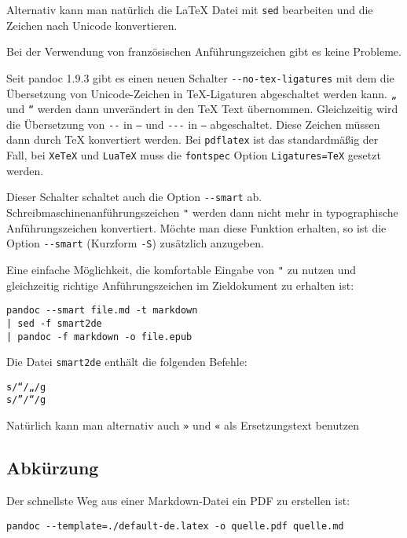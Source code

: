 \documentclass[11pt,ngerman,a4paper]{article}
\begin{document}
Alternativ kann man natürlich die LaTeX Datei mit \texttt{sed}
bearbeiten und die Zeichen nach Unicode konvertieren.

Bei der Verwendung von französischen Anführungszeichen gibt es keine
Probleme.

Seit pandoc 1.9.3 gibt es einen neuen Schalter
\texttt{-{}-no-tex-ligatures} mit dem die Übersetzung von
Unicode-Zeichen in TeX-Ligaturen abgeschaltet werden kann. \texttt{„}
und \texttt{“} werden dann unverändert in den TeX Text übernommen.
Gleichzeitig wird die Übersetzung von \texttt{-{}-} in \texttt{–} und
\texttt{-{}-{}-} in \texttt{—} abgeschaltet. Diese Zeichen müssen dann
durch TeX konvertiert werden. Bei \texttt{pdflatex} ist das
standardmäßig der Fall, bei \texttt{XeTeX} und \texttt{LuaTeX} muss die
\texttt{fontspec} Option \texttt{Ligatures=TeX} gesetzt werden.

Dieser Schalter schaltet auch die Option \texttt{-{}-smart} ab.
Schreibmaschinenanführungszeichen \texttt{"} werden dann nicht mehr in
typographische Anführungszeichen konvertiert. Möchte man diese Funktion
erhalten, so ist die Option \texttt{-{}-smart} (Kurzform \texttt{-S})
zusätzlich anzugeben.

Eine einfache Möglichkeit, die komfortable Eingabe von \texttt{"} zu
nutzen und gleichzeitig richtige Anführungszeichen im Zieldokument zu
erhalten ist:

\begin{verbatim}
pandoc --smart file.md -t markdown 
| sed -f smart2de 
| pandoc -f markdown -o file.epub
\end{verbatim}

Die Datei \texttt{smart2de} enthält die folgenden Befehle:

\begin{verbatim}
s/“/„/g
s/”/“/g
\end{verbatim}

Natürlich kann man alternativ auch \texttt{»} und \texttt{«} als
Ersetzungstext benutzen

\subsection{Abkürzung}\label{abkuxfcrzung}

Der schnellste Weg aus einer Markdown-Datei ein PDF zu erstellen ist:

\begin{verbatim}
pandoc --template=./default-de.latex -o quelle.pdf quelle.md
\end{verbatim}
\end{document}
